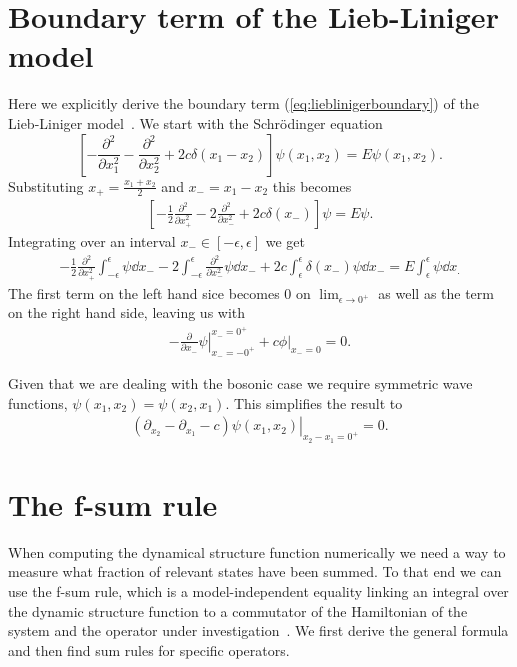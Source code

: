 \documentclass[11pt, a4paper]{report} %
\begin{document}
\appendix

\chapter{Boundary term of the Lieb-Liniger model}\label{cha:boundary}

Here we explicitly derive the boundary term (\cref{eq:lieblinigerboundary}) of the Lieb-Liniger model~\cite{Caux2015}.
We start with the Schrödinger equation
\begin{equation}
	\left[- \frac{\partial^2}{\partial x_1^2} - \frac{\partial^2}{\partial x_2^2} + 2c \delta(x_1 - x_2)\right] \psi(x_1, x_2) = E \psi(x_1,x_2).
\end{equation} 
Substituting \(x_+ = \frac{x_1+x_2}{2}\) and \(x_-=x_1-x_2\) this becomes
\begin{align}
  \label{eq:17}
  	\left[-\frac{1}{2}\frac{\partial^2}{\partial x_+^2} - 2\frac{\partial^2}{\partial x_-^2} + 2c \delta(x_-)\right] \psi = E\psi.
\end{align}
Integrating over an interval \(x_-\in[-\epsilon,\epsilon]\) we get
\begin{align}
  \label{eq:18}
  -\frac{1}{2} \frac{\partial^2}{\partial x_+^2} \int_{-\epsilon}^{\epsilon} \psi \dd x_- - 2 \int_{-\epsilon}^{\epsilon} \frac{\partial^2}{\partial x_-^2}\psi \dd x_- + 2c\int_{\epsilon}^{\epsilon} \delta(x_-)\psi \dd x_- = E\int_{\epsilon}^{\epsilon} \psi \dd x_.
\end{align}
The first term on the left hand sice becomes 0 on \(\lim_{\epsilon\to0^+}\) as well as the term on the right hand side, leaving us with
\begin{align}
  \label{eq:19}
  \left.- \frac{\partial}{\partial x_-} \psi \right|_{x_-=-0^+}^{x_-=0^+}  + \left.c\phi\right|_{x_-=0} = 0.
\end{align}

Given that we are dealing with the bosonic case we require symmetric wave functions, \(\psi(x_1,x_2)=\psi(x_2,x_1)\).
This simplifies the result to
\begin{align}
  \label{eq:20}
  \left.(\partial_{x_2} - \partial_{x_1} - c) \psi(x_1, x_2)\right|_{x_2-x_1=0^+} = 0.
\end{align}

\chapter{The f-sum rule}\label{cha:f-sum-rule}

When computing the dynamical structure function numerically we need a way to measure what fraction of relevant states have been summed.
To that end we can use the f-sum rule, which is a model-independent equality linking an integral over the dynamic structure function to a commutator of the Hamiltonian of the system and the operator under investigation~\cite{pitaevskii}.
We first derive the general formula and then find sum rules for specific operators.
\end{document}
